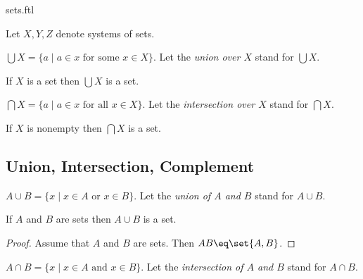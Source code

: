 \documentclass{naproche-library}
\begin{document}
\begin{smodule}{sets.ftl}
\begin{forthel}
  Let $X,Y,Z$ denote systems of sets.
\end{forthel}

\begin{definition*}[forthel,id=BigUnionDef,printid]
  $\bigcup X=\{a\mid a\in x\text{ for some  }x\in X\}$.
  Let the \emph{union over $X$} stand for $\bigcup X$.
\end{definition*}

\begin{axiom*}[forthel,title=Union Axiom,id=BigUnionAx,printid]
  If $X$ is a set then $\bigcup X$ is a set.
\end{axiom*}

\begin{definition*}[forthel,id=BigIntersectionDef,printid]
  $\bigcap X=\{a\mid a\in x\text{ for all }x\in X\}$.
  Let the \emph{intersection over $X$} stand for $\bigcap X$.
\end{definition*}

\begin{proposition*}[forthel,id=BigIntersectionProp,printid]
  If $X$ is nonempty then $\bigcap X$ is a set.
\end{proposition*}


\subsection{Union, Intersection, Complement}

\begin{definition*}[forthel,id=UnionDef,printid]
  $A\cup B=\{x\mid x\in A\text{ or }x\in B\}$.
  Let the \emph{union of $A$ and $B$} stand for $A\cup B$.
\end{definition*}

\begin{forthel}
  \begin{proposition*}[id=UnionProp,printid]
    If $A$ and $B$ are sets then $A\cup B$ is a set.
  \end{proposition*}
  \begin{proof}
    Assume that $A$ and $B$ are sets.
    Then $A\cup B\eq \bigcup\set{A,B}$.
  \end{proof}
\end{forthel}

\begin{definition*}[forthel,id=IntersectionDef,printid]
  $A\cap B=\{x\mid x\in A\text{ and }x\in B\}$.
  Let the \emph{intersection of $A$ and $B$} stand for $A\cap B$.
\end{definition*}


\end{smodule}
\end{document}
